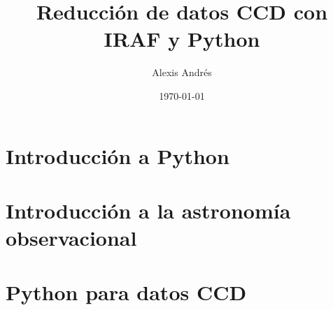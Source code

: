 \documentclass[11pt, letterpaper]{report}
\title{\bf\Huge Reducción de datos CCD con IRAF y Python}
\author{Alexis Andrés}
\date{\today}
\begin{document}
\renewcommand*\thepart{\arabic{part}}
\renewcommand{\partname}{Unidad}
\renewcommand{\chaptername}{Clase}
\renewcommand{\tablename}{Tabla}

\maketitle

\tableofcontents

\part{Introducción a Python}





\part{Introducción a la astronomía observacional}




\part{Python para datos CCD}



\end{document}
